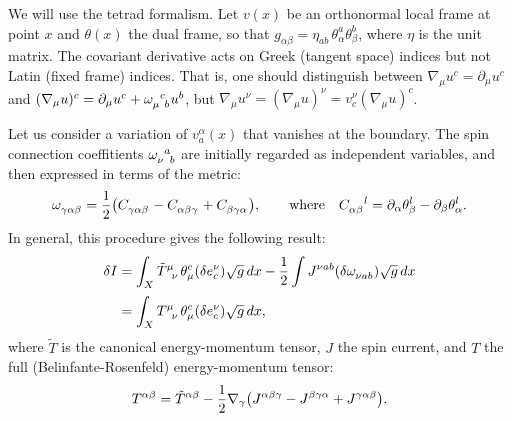 \documentclass[12pt]{article}
\begin{document}
We will use the tetrad formalism. Let $v(x)$ be an orthonormal local frame at point $x$ and $\theta(x)$ the dual frame, so that $g_{\alpha\beta}=\eta_{ab}\,\theta^a_\alpha \theta^b_\beta$, where $\eta$ is the unit matrix. The covariant derivative acts on Greek (tangent space) indices but not Latin (fixed frame) indices. That is, one should distinguish between $\nabla_{\mu}u^{c}=\partial_{\mu}u^{c}$ and $(\nabla_{\mu}u)^{c} =\partial_{\mu}u^{c} +\tensor{\omega}{_\mu^c_b}u^{b}$, but $\nabla_{\mu}u^{\nu} =(\nabla_{\mu}u)^{\nu} =v_c^{\nu}(\nabla_{\mu}u)^{c}$.

Let us consider a variation of $v_a^\alpha(x)$ that vanishes at the boundary. The spin connection coeffitients $\tensor{\omega}{_\nu^a_b}$ are initially regarded as independent variables, and then expressed in terms of the metric:
\begin{equation}
\tensor{\omega}{_\gamma_\alpha_\beta} 
=\frac{1}{2}\bigl(
\tensor{C}{_\gamma_\alpha_\beta}
-\tensor{C}{_\alpha_\beta_\gamma} 
+\tensor{C}{_\beta_\gamma_\alpha}\bigr),\qquad
\text{where}\quad
\tensor{C}{_\alpha_\beta^l}
=\partial_\alpha\theta^l_\beta-\partial_\beta\theta^l_\alpha.
\end{equation}
In general, this procedure gives the following result:
\begin{align}
\label{varact1}
\delta I&=\int_{X} \tensor{\tilde{T}}{^\mu_\nu}\theta^c_\mu(\delta e^\nu_c)
\sqrt{g}\,dx
-\frac{1}{2}\int \tensor{J}{^\nu^a^b}(\delta\tensor{\omega}{_\nu_a_b})
\sqrt{g}\,dx\\[2pt]
\label{varact2}
&=\int_{X} \tensor{T}{^\mu_\nu}\theta^c_\mu(\delta e^\nu_c)
\sqrt{g}\,dx,
\end{align}
where $\tilde{T}$ is the canonical energy-momentum tensor, $J$ the spin current, and $T$ the full (Belinfante-Rosenfeld) energy-momentum tensor:
\begin{equation}
\tensor{T}{^\alpha^\beta}
=\tensor{\tilde{T}}{^\alpha^\beta} -\frac{1}{2}\nabla_{\gamma}\bigl(
J^{\alpha\beta\gamma} -J^{\beta\gamma\alpha} +J^{\gamma\alpha\beta}
\bigr).
\end{equation}
\end{document}
